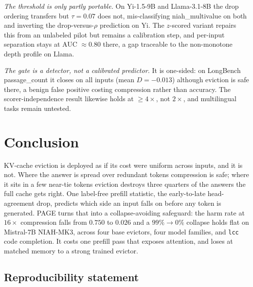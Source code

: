 \documentclass{article}
\newcommand{\method}{PAGE\xspace}
\begin{document}
\emph{The threshold is only partly portable.} On Yi-1.5-9B and Llama-3.1-8B
the drop ordering transfers but $\tau = 0.07$ does not, mis-classifying
niah\_multivalue on both and inverting the drop-versus-$\rho$ prediction on
Yi. The $z$-scored variant repairs this from an unlabeled pilot but remains a
calibration step, and per-input separation stays at AUC $\approx 0.80$ there,
a gap traceable to the non-monotone depth profile on Llama.

\emph{The gate is a detector, not a calibrated predictor.} It is one-sided: on
LongBench passage\_count it closes on all inputs (mean $D = -0.013$) although
eviction is safe there, a benign false positive costing compression rather
than accuracy. The scorer-independence result likewise holds at $\ge 4\times$,
not $2\times$, and multilingual tasks remain untested.

\section{Conclusion}

KV-cache eviction is deployed as if its cost were uniform across inputs, and
it is not. Where the answer is spread over redundant tokens compression is
safe; where it sits in a few near-tie tokens eviction destroys three quarters
of the answers the full cache gets right. One label-free prefill statistic, the
early-to-late head-agreement drop, predicts which side an input falls on
before any token is generated. \method turns that into a collapse-avoiding safeguard: the harm rate at
$16\times$ compression falls from $0.750$ to $0.026$ and a $99\% \to 0\%$
collapse holds flat on Mistral-7B NIAH-MK3, across four base evictors, four
model families, and \texttt{lcc} code completion. It costs one prefill pass
that exposes attention, and loses at matched memory to a strong trained
evictor.

\subsection*{Reproducibility statement}
\end{document}
